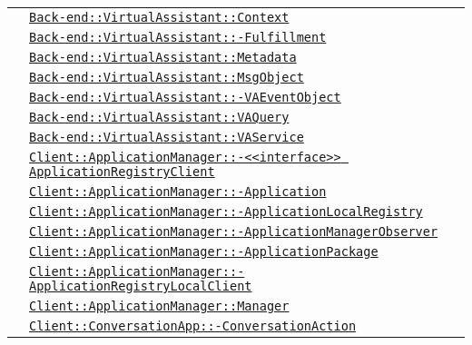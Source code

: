 \begin{longtable}{|>{\centering}m{3cm}|m{10cm}<{\centering}|}
& \hyperref[Back-end::VirtualAssistant::Context]{\texttt{Back-end::VirtualAssistant::Context}}\\
& \hyperref[Back-end::VirtualAssistant::Fulfillment]{\texttt{Back-end::VirtualAssistant::-\linebreak Fulfillment}}\\
& \hyperref[Back-end::VirtualAssistant::Metadata]{\texttt{Back-end::VirtualAssistant::Metadata}}\\
& \hyperref[Back-end::VirtualAssistant::MsgObject]{\texttt{Back-end::VirtualAssistant::MsgObject}}\\
& \hyperref[Back-end::VirtualAssistant::VAEventObject]{\texttt{Back-end::VirtualAssistant::-\linebreak VAEventObject}}\\
& \hyperref[Back-end::VirtualAssistant::VAQuery]{\texttt{Back-end::VirtualAssistant::VAQuery}}\\
& \hyperref[Back-end::VirtualAssistant::VAService]{\texttt{Back-end::VirtualAssistant::VAService}}\\
& \hyperref[Client::ApplicationManager::<<interface>> ApplicationRegistryClient]{\texttt{Client::ApplicationManager::-\linebreak <<interface>> ApplicationRegistryClient}}\\
& \hyperref[Client::ApplicationManager::Application]{\texttt{Client::ApplicationManager::-\linebreak Application}}\\
& \hyperref[Client::ApplicationManager::ApplicationLocalRegistry]{\texttt{Client::ApplicationManager::-\linebreak ApplicationLocalRegistry}}\\
& \hyperref[Client::ApplicationManager::ApplicationManagerObserver]{\texttt{Client::ApplicationManager::-\linebreak ApplicationManagerObserver}}\\
& \hyperref[Client::ApplicationManager::ApplicationPackage]{\texttt{Client::ApplicationManager::-\linebreak ApplicationPackage}}\\
& \hyperref[Client::ApplicationManager::ApplicationRegistryLocalClient]{\texttt{Client::ApplicationManager::-\linebreak ApplicationRegistryLocalClient}}\\
& \hyperref[Client::ApplicationManager::Manager]{\texttt{Client::ApplicationManager::Manager}}\\
& \hyperref[Client::ConversationApp::ConversationAction]{\texttt{Client::ConversationApp::-\linebreak ConversationAction}}\\

\end{longtable}
